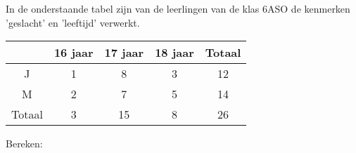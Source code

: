 \documentclass[12pt]{article}
\begin{document}

\begin{oefening}
In de onderstaande tabel zijn van de leerlingen van de klas 6ASO de kenmerken 'geslacht' en 'leeftijd' verwerkt.

\begin{center}
  \begin{tabular}{c|c|c|c|c}
    & 16 jaar & 17 jaar & 18 jaar & Totaal\\
    \hline
    J & 1 & 8 & 3 & 12\\
    \hline
    M & 2 & 7 & 5 & 14\\
    \hline
    Totaal & 3 & 15 & 8 & 26\\
  \end{tabular}
\end{center}

Bereken:

\end{oefening}
\end{document}
